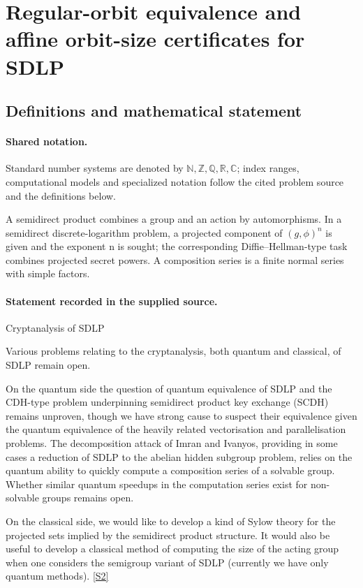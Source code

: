 \documentclass[11pt]{article}
\newcommand{\sref}[2]{\hyperlink{source:#1:#2}{[S#2]}}
\begin{document}
\section{Regular-orbit equivalence and affine orbit-size certificates for SDLP}\label{statement}

\subsection{Definitions and mathematical statement}

\paragraph{Shared notation.}Standard number systems are denoted by $\mathbb N,\mathbb Z,\mathbb Q,\mathbb R,\mathbb C$; index ranges, computational models and specialized notation follow the cited problem source and the definitions below.


A semidirect product combines a group and an action by automorphisms. In a semidirect discrete-logarithm problem, a projected component of $(g,\phi)^n$ is given and the exponent n is sought; the corresponding Diffie--Hellman-type task combines projected secret powers. A composition series is a finite normal series with simple factors.
\paragraph{Statement recorded in the supplied source.}
Cryptanalysis of SDLP

Various problems relating to the cryptanalysis, both quantum and classical, of SDLP remain open.

On the quantum side the question of quantum equivalence of SDLP and the CDH-type problem underpinning semidirect product key exchange (SCDH) remains unproven, though we have strong cause to suspect their equivalence given the quantum equivalence of the heavily related vectorisation and parallelisation problems. The decomposition attack of Imran and Ivanyos, providing in some cases a reduction of SDLP to the abelian hidden subgroup problem, relies on the quantum ability to quickly compute a composition series of a solvable group. Whether similar quantum speedups in the computation series exist for non-solvable groups remains open.

On the classical side, we would like to develop a kind of Sylow theory for the projected sets implied by the semidirect product structure. It would also be useful to develop a classical method of computing the size of the acting group when one considers the semigroup variant of SDLP (currently we have only quantum methods). \sref{statement}{2}
\end{document}
